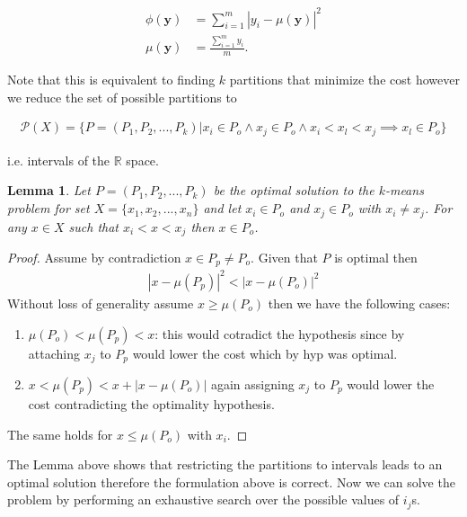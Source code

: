 \documentclass[a4paper]{article}
\newcommand{\abs}[1]{\left\lvert#1\right\rvert}
\newtheorem{lemma}{Lemma}
\begin{document}
\begin{enumerate}
    \begin{align*}
      \phi(\mathbf{y}) &= \sum_{i = 1}^m \abs{y_i - \mu(\mathbf{y})}^2 \\
      \mu(\mathbf{y}) &= \frac{\sum_{i = 1}^m y_i}{m}.
    \end{align*}

    Note that this is equivalent to finding $k$ partitions that minimize the
    cost however we reduce the set of possible partitions to
    
    \begin{align*}
      \mathcal{P}(X) = \{P = (P_1, P_2, ..., P_k) | x_i
    \in P_o \land x_j \in P_o \land x_i < x_l < x_j \implies x_l \in P_o\}
    \end{align*}

    i.e. intervals of the $\mathbb{R}$ space.


    \begin{lemma}
      Let $P = (P_1, P_2, ..., P_k)$ be the optimal solution to the $k$-means
      problem for set $X = \{x_1, x_2, ..., x_n\}$ and let $x_i \in P_o$ and $x_j
      \in P_o$ with $x_i \neq x_j$. For any $x \in X$ such that $x_i < x <
      x_j$ then $x \in P_o$.
    \end{lemma}
    \begin{proof}
      Assume by contradiction $x \in P_p \neq P_o$. Given that $P$ is optimal
      then
      \begin{align*}
        \abs{x - \mu(P_p)}^2 < \abs{x - \mu(P_o)}^2
      \end{align*}
      Without loss of generality assume $x \geq \mu(P_o)$ then we have the
      following cases:
      \begin{enumerate}
        \item $\mu(P_o) < \mu(P_p) < x$: this would cotradict the hypothesis
          since by
        attaching $x_j$ to $P_p$ would lower the cost which by hyp was optimal.

        \item $ x < \mu(P_p) < x + \abs{x - \mu(P_o)} $ again assigning $x_j$ to
          $P_p$ would lower the cost contradicting the optimality hypothesis.
      \end{enumerate}
      The same holds for $x \le \mu(P_o)$ with $x_i$.
    \end{proof}

    The Lemma above shows that restricting the partitions to intervals leads to
    an optimal solution therefore the formulation above is correct.
    Now we can solve the problem by performing an exhaustive search over the
    possible values of $i_j$s.
    

\end{enumerate}
\end{document}
